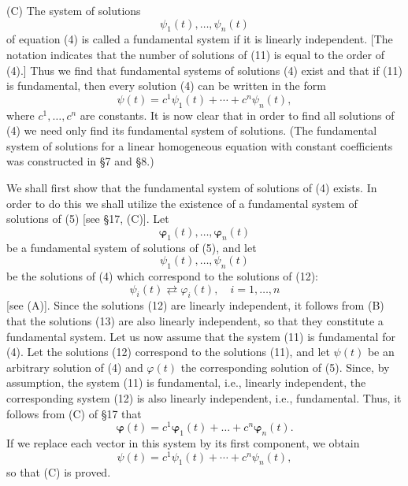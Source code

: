 \documentclass[10pt,a5paper]{book}
\theoremstyle{plain}
\theoremstyle{definition}
\theoremstyle{remark}
\begin{document}
(C) The system of solutions
\begin{equation*}
\psi_{1}(t), \ldots, \psi_{n}(t) \tag{11}
\end{equation*}
of equation (4) is called a fundamental system if it is linearly independent. [The notation indicates that the number of solutions of (11) is equal to the order of (4).] Thus we find that fundamental systems of solutions (4) exist and that if (11) is fundamental, then every solution (4) can be written in the form
\[
\psi(t)=c^{1} \psi_{1}(t)+\cdots+c^{n} \psi_{n}(t),
\]
where $c^{1}, \ldots, c^{n}$ are constants. It is now clear that in order to find all solutions of (4) we need only find its fundamental system of solutions. (The fundamental system of solutions for a linear homogeneous equation with constant coefficients was constructed in §7 and §8.)

We shall first show that the fundamental system of solutions of (4) exists. In order to do this we shall utilize the existence of a fundamental system of solutions of (5) [see §17, (C)]. Let
\begin{equation*}
\boldsymbol{\varphi}_{1}(t), \ldots, \boldsymbol{\varphi}_{n}(t) \tag{12}
\end{equation*}
be a fundamental system of solutions of (5), and let
\begin{equation*}
\psi_{1}(t), \ldots, \psi_{n}(t) \tag{13}
\end{equation*}
be the solutions of (4) which correspond to the solutions of (12):
\[
\psi_{i}(t) \rightleftarrows \varphi_{i}(t), \quad i=1, \ldots, n
\]
[see (A)]. Since the solutions (12) are linearly independent, it follows from (B) that the solutions (13) are also linearly independent, so that they constitute a fundamental system. Let us now assume that the system (11) is fundamental for (4). Let the solutions (12) correspond to the solutions (11), and let $\psi(t)$ be an arbitrary solution of (4) and $\varphi(t)$ the corresponding solution of (5). Since, by assumption, the system (11) is fundamental, i.e., linearly independent, the corresponding system (12) is also linearly independent, i.e., fundamental. Thus, it follows from (C) of §17 that
\[
\boldsymbol{\varphi}(t)=c^{1} \boldsymbol{\varphi}_{1}(t)+\ldots+c^{n} \boldsymbol{\varphi}_{n}(t) .
\]
If we replace each vector in this system by its first component, we obtain
\[
\psi(t)=c^{1} \psi_{1}(t)+\cdots+c^{n} \psi_{n}(t),
\]
so that (C) is proved.
\end{document}

